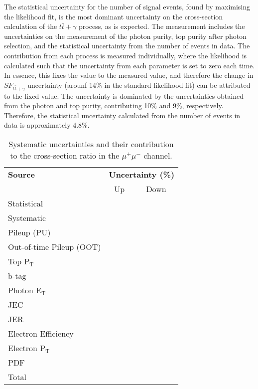 The statistical uncertainty for the number of signal events, found by maximising the likelihood fit, is the most dominant uncertainty on the cross-section calculation of the $t\bar{t}+\gamma$ process, as is expected. The measurement includes the uncertainties on the measurement of the photon purity, top purity after photon selection, and the statistical uncertainty from the number of events in data. The contribution from each process is measured individually, where the likelihood is calculated such that the uncertainty from each parameter is set to zero each time. In essence, this fixes the value to the measured value, and therefore the change in $SF_{t\bar{t}+\gamma}$ uncertainty (arounf 14\% in the standard likelihood fit) can be attributed to the fixed value. The uncertainty is dominated by the uncertainties obtained from the photon and top purity, contributing 10\% and 9\%, respectively. Therefore, the statistical uncertainty calculated from the number of events in data is approximately 4.8\%. 

\begin{table}[h!] 
\centering
\begin{tabular}{|l|c|c|}
\hline
\textbf{Source} & \multicolumn{2}{c|}{\textbf{Uncertainty (\%)}} \\ \cline{2-3}
 & Up & Down \\
\hline
Statistical & & \\
\hline
Systematic & & \\
\hline
Pileup (PU) & & \\
Out-of-time Pileup (OOT) & & \\
Top P$_{\text{T}}$ & & \\
b-tag & & \\
Photon E$_{\text{T}}$ & & \\
JEC & & \\
JER & & \\
Electron Efficiency & & \\
Electron P$_{\text{T}}$ & & \\
PDF & & \\
\hline
Total & & \\
\hline
\end{tabular} 
\caption{Systematic uncertainties and their contribution to the cross-section ratio in the $\mu^+\mu^-$ channel.}
\label{tab-systuncertsMuMu}
\end{table}

